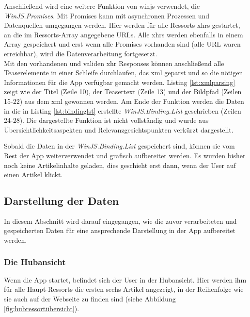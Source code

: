 \documentclass[12pt,a4paper,bibtotoc,abstracton]{scrartcl}
\begin{document}
Anschließend wird eine weitere Funktion von \ac{winjs} verwendet, die \textit{WinJS.Promises}. Mit Promises kann mit asynchronen Prozessen und Datenquellen umgegangen werden. Hier werden für alle Ressorts \ac{xhr}s gestartet, an die im Ressorts-Array angegebene URLs. Alle \ac{xhr}s werden ebenfalls in einem Array gespeichert und erst wenn alle Promises vorhanden sind (alle URL waren erreichbar), wird die Datenverarbeitung fortgesetzt. \\
Mit den vorhandenen und validen \ac{xhr} Responses können anschließend alle Teaserelemente in einer Schleife durchlaufen, das \ac{xml} geparst und so die nötigen Informationen für die App verfügbar gemacht werden. Listing \ref{lst:xmlparsing} zeigt wie der Titel (Zeile 10), der Teasertext (Zeile 13) und der Bildpfad (Zeilen 15-22) aus dem \ac{xml} gewonnen werden. Am Ende der Funktion werden die Daten in die in Listing \ref{lst:bindinglst} erstellte \textit{WinJS.Binding.List} geschrieben (Zeilen 24-28). Die dargestellte Funktion ist nicht vollständig und wurde aus Übersichtlichkeitsaspekten und Relevanzgesichtspunkten verkürzt dargestellt.

\begin{minipage}{\linewidth}
  
\end{minipage}

Sobald die Daten in der \textit{WinJS.Binding.List} gespeichert sind, können sie vom Rest der App weiterverwendet und grafisch aufbereitet werden. Es wurden bisher noch keine Artikelinhalte geladen, dies geschieht erst dann, wenn der User auf einen Artikel klickt.

\subsection{Darstellung der Daten}
\label{subsec:darstellungderdaten}
In diesem Abschnitt wird darauf eingegangen, wie die zuvor verarbeiteten und gespeicherten Daten für eine ansprechende Darstellung in der App aufbereitet werden.

\subsubsection{Die Hubansicht}
\label{subsubsec:hubansicht}
Wenn die App startet, befindet sich der User in der Hubansicht. Hier werden ihm für alle Haupt-Ressorts die ersten sechs Artikel angezeigt, in der Reihenfolge wie sie auch auf der Webseite zu finden sind (siehe Abbildung \ref{fig:hubressortübersicht}).
\end{document}
